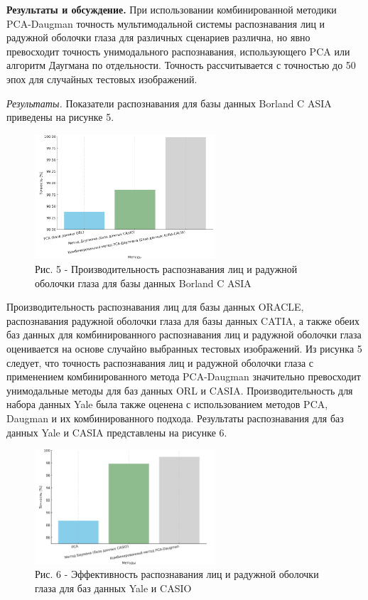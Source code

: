 \begin{multicols}{2}
{\bfseries Результаты и обсуждение.} При использовании комбинированной
методики PCA-Daugman точность мультимодальной системы распознавания лиц
и радужной оболочки глаза для различных сценариев различна, но явно
превосходит точность унимодального распознавания, использующего PCA или
алгоритм Даугмана по отдельности. Точность рассчитывается с точностью до
50 эпох для случайных тестовых изображений.

\emph{Результаты.} Показатели распознавания для базы данных Borland C
ASIA приведены на рисунке 5.
\end{multicols}

\begin{figure}[H]
	\centering
	\includegraphics[width=0.6\textwidth]{assets/87}
	\caption*{Рис. 5 - Производительность распознавания лиц и радужной оболочки глаза для базы данных Borland C ASIA}
\end{figure}

\begin{multicols}{2}
Производительность распознавания лиц для базы данных ORACLE,
распознавания радужной оболочки глаза для базы данных CATIA, а также
обеих баз данных для комбинированного распознавания лиц и радужной
оболочки глаза оценивается на основе случайно выбранных тестовых
изображений. Из рисунка 5 следует, что точность распознавания лиц и
радужной оболочки глаза с применением комбинированного метода
PCA-Daugman значительно превосходит унимодальные методы для баз данных
ORL и CASIA. Производительность для набора данных Yale была также
оценена с использованием методов PCA, Daugman и их комбинированного
подхода. Результаты распознавания для баз данных Yale и CASIA
представлены на рисунке 6.
\end{multicols}

\begin{figure}[H]
	\centering
	\includegraphics[width=0.6\textwidth]{assets/88}
	\caption*{Рис. 6 - Эффективность распознавания лиц и радужной оболочки глаза для баз данных Yale и CASIO}
\end{figure}

